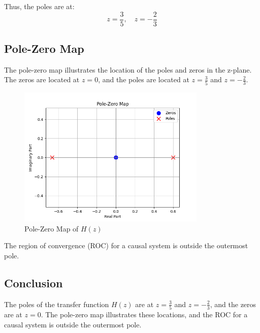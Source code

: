 Thus, the poles are at:
\[ z = \frac{3}{5}, \quad z = -\frac{2}{3} \]

\subsection*{Pole-Zero Map}
The pole-zero map illustrates the location of the poles and zeros in the z-plane. The zeros are located at \( z = 0 \), and the poles are located at \( z = \frac{3}{5} \) and \( z = -\frac{2}{3} \).

\begin{figure}[h]
    \centering
    \includegraphics[width=0.8\textwidth]{fig/ex2_d_pole_zero_map.png}
    \caption{Pole-Zero Map of \( H(z) \)}
    \label{fig:ex2_d_pole_zero_map}
\end{figure}

The region of convergence (ROC) for a causal system is outside the outermost pole.

\subsection*{Conclusion}
The poles of the transfer function \( H(z) \) are at \( z = \frac{3}{5} \) and \( z = -\frac{2}{3} \), and the zeros are at \( z = 0 \). The pole-zero map illustrates these locations, and the ROC for a causal system is outside the outermost pole.
